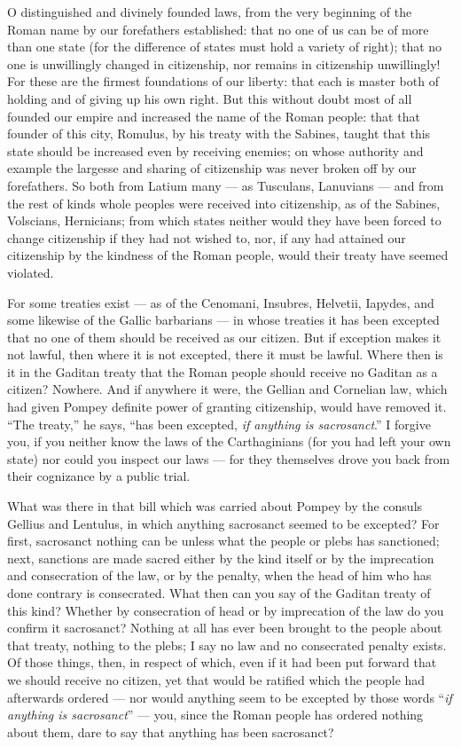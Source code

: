  O distinguished and divinely founded laws, from the very beginning of the Roman name by our forefathers established: that no one of us can be of more than one state (for the difference of states must hold a variety of right); that no one is unwillingly changed in citizenship, nor remains in citizenship unwillingly! For these are the firmest foundations of our liberty: that each is master both of holding and of giving up his own right. But this without doubt most of all founded our empire and increased the name of the Roman people: that that founder of this city, Romulus, by his treaty with the Sabines, taught that this state should be increased even by receiving enemies; on whose authority and example the largesse and sharing of citizenship was never broken off by our forefathers. So both from Latium many --- as Tusculans, Lanuvians --- and from the rest of kinds whole peoples were received into citizenship, as of the Sabines, Volscians, Hernicians; from which states neither would they have been forced to change citizenship if they had not wished to, nor, if any had attained our citizenship by the kindness of the Roman people, would their treaty have seemed violated.

 For some treaties exist --- as of the Cenomani, Insubres, Helvetii, Iapydes, and some likewise of the Gallic barbarians --- in whose treaties it has been excepted that no one of them should be received as our citizen. But if exception makes it not lawful, then where it is not excepted, there it must be lawful. Where then is it in the Gaditan treaty that the Roman people should receive no Gaditan as a citizen? Nowhere. And if anywhere it were, the Gellian and Cornelian law, which had given Pompey definite power of granting citizenship, would have removed it. ``The treaty,'' he says, ``has been excepted, \textit{if anything is sacrosanct}.'' I forgive you, if you neither know the laws of the Carthaginians (for you had left your own state) nor could you inspect our laws --- for they themselves drove you back from their cognizance by a public trial.

 What was there in that bill which was carried about Pompey by the consuls Gellius and Lentulus, in which anything sacrosanct seemed to be excepted? For first, sacrosanct nothing can be unless what the people or plebs has sanctioned; next, sanctions are made sacred either by the kind itself or by the imprecation and consecration of the law, or by the penalty, when the head of him who has done contrary is consecrated. What then can you say of the Gaditan treaty of this kind? Whether by consecration of head or by imprecation of the law do you confirm it sacrosanct? Nothing at all has ever been brought to the people about that treaty, nothing to the plebs; I say no law and no consecrated penalty exists. Of those things, then, in respect of which, even if it had been put forward that we should receive no citizen, yet that would be ratified which the people had afterwards ordered --- nor would anything seem to be excepted by those words ``\textit{if anything is sacrosanct}'' --- you, since the Roman people has ordered nothing about them, dare to say that anything has been sacrosanct?

